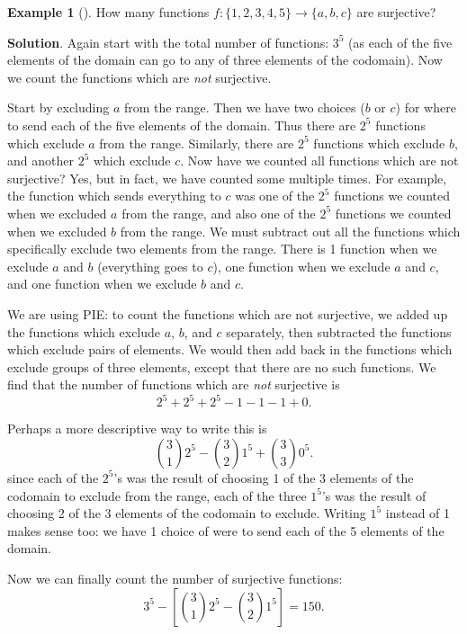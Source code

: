 \documentclass[10pt,]{book}
\theoremstyle{plain}
\theoremstyle{definition}
\theoremstyle{definition}
\newtheorem{example}[theorem]{Example}
\theoremstyle{definition}
\theoremstyle{definition}
\numberwithin{equation}{chapter}
\begin{document}
\begin{example}[]\label{example-18}
\hypertarget{p-1000}{}%
How many functions \(f: \{1,2,3,4,5\} \to \{a,b,c\}\) are surjective?%
\par\smallskip%
\noindent\textbf{Solution}.\hypertarget{solution-85}{}\quad%
\hypertarget{p-1001}{}%
Again start with the total number of functions: \(3^5\) (as each of the five elements of the domain can go to any of three elements of the codomain). Now we count the functions which are \emph{not} surjective.%
\par
\hypertarget{p-1002}{}%
Start by excluding \(a\) from the range. Then we have two choices (\(b\) or \(c\)) for where to send each of the five elements of the domain. Thus there are \(2^5\) functions which exclude \(a\) from the range. Similarly, there are \(2^5\) functions which exclude \(b\), and another \(2^5\) which exclude \(c\). Now have we counted all functions which are not surjective? Yes, but in fact, we have counted some multiple times. For example, the function which sends everything to \(c\) was one of the \(2^5\) functions we counted when we excluded \(a\) from the range, and also one of the \(2^5\) functions we counted when we excluded \(b\) from the range. We must subtract out all the functions which specifically exclude two elements from the range. There is 1 function when we exclude \(a\) and \(b\) (everything goes to \(c\)), one function when we exclude \(a\) and \(c\), and one function when we exclude \(b\) and \(c\).%
\par
\hypertarget{p-1003}{}%
We are using PIE: to count the functions which are not surjective, we added up the functions which exclude \(a\), \(b\), and \(c\) separately, then subtracted the functions which exclude pairs of elements. We would then add back in the functions which exclude groups of three elements, except that there are no such functions. We find that the number of functions which are \emph{not} surjective is%
\begin{equation*}
2^5 + 2^5 + 2^5 - 1 - 1 - 1 + 0.
\end{equation*}
%
\par
\hypertarget{p-1004}{}%
Perhaps a more descriptive way to write this is%
\begin{equation*}
{3 \choose 1}2^5 - {3 \choose 2}1^5 + {3 \choose 3}0^5.
\end{equation*}
since each of the \(2^5\)'s was the result of choosing 1 of the 3 elements of the codomain to exclude from the range, each of the three \(1^5\)'s was the result of choosing 2 of the 3 elements of the codomain to exclude. Writing \(1^5\) instead of 1 makes sense too: we have 1 choice of were to send each of the 5 elements of the domain.%
\par
\hypertarget{p-1005}{}%
Now we can finally count the number of surjective functions:%
\begin{equation*}
3^5 - \left[{3 \choose 1}2^5 - {3 \choose 2}1^5\right] = 150.
\end{equation*}
%
\end{example}
\end{document}
